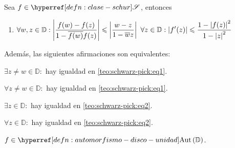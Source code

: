 \begin{teo}\label{teo:schwarz-pick}
    Sea $f \in \exhyperref[defn:clase-schur]{clase-schur}{\mathscr{S}}$, entonces
    \begin{enumerate}[label=\textnormal{(\arabic*)}]
        \item\label{teo:schwarz-pick:eq1} $\displaystyle \forall w, z \in \mathbb{D} : \left|\frac{f(w) - f(z)}{1 - \overline{f(w)} f(z)}\right| \leqslant \left|\frac{w - z}{1 - \overline{w} z}\right|$
        \hspace{2em}\inlineitem\label{teo:schwarz-pick:eq2} $\displaystyle \forall z \in \mathbb{D} : \left|f'(z)\right| \leqslant \frac{1 - \left|f(z)\right|^2}{1 - \left|z\right|^2}$
    \end{enumerate}


    Además, las siguientes afirmaciones son equivalentes:
    \begin{enu}[2][label=\textnormal{(\roman*)}, ref=\textnormal{(\roman*)}]
        \item\label{teo:schwarz-pick:i} $\exists z \neq w \in \mathbb{D} : $ hay igualdad en \ref{teo:schwarz-pick:eq1}.
        \item\label{teo:schwarz-pick:ii} $\forall z \neq w \in \mathbb{D} : $ hay igualdad en \ref{teo:schwarz-pick:eq1}.
        \item\label{teo:schwarz-pick:iii} $\exists z \in \mathbb{D} : $ hay igualdad en \ref{teo:schwarz-pick:eq2}.
        \item\label{teo:schwarz-pick:iv} $\forall z \in \mathbb{D} : $ hay igualdad en \ref{teo:schwarz-pick:eq2}.
        \item\label{teo:schwarz-pick:v} $f \in \exhyperref[defn:automorfismo-disco-unidad]{automorfismo-disco-unidad}{\mathrm{Aut} \left(\mathbb{D} \right)}$.
        \item[]
    \end{enu}
\end{teo}
